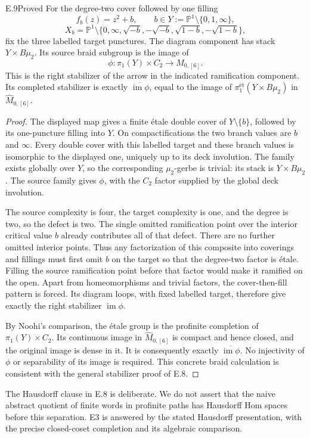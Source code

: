 \begin{claim}{E.9}{Proved}
For the degree-two cover followed by one filling
\[
 f_b(z)=z^2+b,\qquad b\in Y:=\mathbb P^1\setminus\{0,1,\infty\},
\]
\[
 X_b=\mathbb P^1\setminus
 \{0,\infty,\sqrt{-b},-\sqrt{-b},\sqrt{1-b},-\sqrt{1-b}\},
\]
fix the three labelled target punctures. The diagram component
has stack $Y\times B\mu_2$. Its source braid subgroup is
the image of
\[
 \phi:\pi_1(Y)\times C_2\longrightarrow M_{0,[6]}.
\]
This is the right stabilizer of the arrow in the indicated
ramification component. Its completed stabilizer is exactly
$\overline{\operatorname{im}\phi}$, equal to the image
of $\pi_1^{\mathrm{et}}(Y\times B\mu_2)$ in
$\widehat M_{0,[6]}$.
\end{claim}
\begin{proof}
The displayed map gives a finite \'etale double cover of
$Y\setminus\{b\}$, followed by its one-puncture filling
into $Y$. On compactifications the two branch values are
$b$ and $\infty$. Every double cover with this labelled
target and these branch values is isomorphic to the
displayed one, uniquely up to its deck involution.
The family exists globally over $Y$, so the corresponding
$\mu_2$-gerbe is trivial: its stack is $Y\times B\mu_2$.
The source family gives $\phi$, with the $C_2$ factor
supplied by the global deck involution.

The source complexity is four, the target complexity is
one, and the degree is two, so the defect is two. The
single omitted ramification point over the interior
critical value $b$ already contributes all of that
defect. There are no further omitted interior points.
Thus any factorization of this composite into coverings
and fillings must first omit $b$ on the target so that
the degree-two factor is \'etale. Filling the source
ramification point before that factor would make it
ramified on the open. Apart from homeomorphisms and
trivial factors, the cover-then-fill pattern is forced.
Its diagram loops, with fixed labelled target, therefore
give exactly the right stabilizer $\operatorname{im}\phi$.

By Noohi's comparison, the \'etale group is the profinite
completion of $\pi_1(Y)\times C_2$. Its continuous image
in $\widehat M_{0,[6]}$ is compact and hence closed, and
the original image is dense in it. It is consequently
exactly $\overline{\operatorname{im}\phi}$.
No injectivity of $\phi$ or separability of its image
is required. This concrete braid calculation is
consistent with the general stabilizer proof of E.8.
\end{proof}

The Hausdorff clause in E.8 is deliberate. We do not
assert that the naive abstract quotient of finite words
in profinite paths has Hausdorff Hom spaces before this
separation. E3 is answered by the stated Hausdorff
presentation, with the precise closed-coset completion
and its algebraic comparison.
